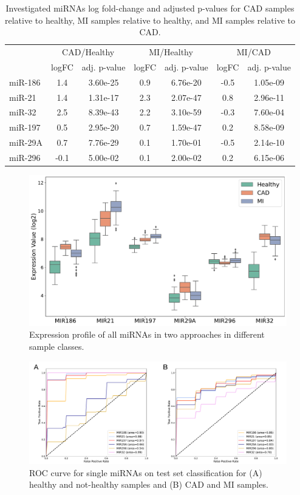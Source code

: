 \documentclass[sn-mathphys,Numbered]{sn-jnl}%
\theoremstyle{thmstyleone}%
\theoremstyle{thmstyletwo}%
\theoremstyle{thmstylethree}%
\begin{document}
\begin{table}
\centering
\caption{Investigated miRNAs log fold-change and adjusted p-values for CAD samples relative to healthy, MI samples relative to healthy, and MI samples relative to CAD.}
\label{tab:mirExptable}
\begin{tabular}{lcccccc}
\toprule
\multicolumn{1}{c}{} & \multicolumn{2}{c}{CAD/Healthy} & \multicolumn{2}{c}{MI/Healthy} & \multicolumn{2}{c}{MI/CAD} \\
\cmidrule(lr){2-3} \cmidrule(lr){4-5} \cmidrule(lr){6-7}
& logFC & adj. p-value & logFC & adj. p-value & logFC & adj. p-value\\
\midrule
miR-186 & 1.4 & 3.60e-25 & 0.9 & 6.76e-20 & -0.5 & 1.05e-09\\
miR-21 & 1.4 & 1.31e-17 & 2.3 & 2.07e-47 & 0.8 & 2.96e-11\\
miR-32 & 2.5 & 8.39e-43 & 2.2 & 3.10e-59 & -0.3 & 7.60e-04\\
miR-197 & 0.5 & 2.95e-20 & 0.7 & 1.59e-47 & 0.2 & 8.58e-09\\
miR-29A & 0.7 & 7.76e-29 & 0.1 & 1.70e-01 & -0.5 & 2.14e-10\\
miR-296 & -0.1 & 5.00e-02 & 0.1 & 2.00e-02 & 0.2 & 6.15e-06\\
\bottomrule
\end{tabular}
\end{table}

\begin{figure}
\centering 
\includegraphics[width=0.9\linewidth]{Expressionforall}
\caption{Expression profile of all miRNAs in two approaches in different sample classes.}\label{fig:Expall}
\end{figure}

\begin{figure}
\centering 
\includegraphics[width=0.95\linewidth]{miRs ROCs}
\caption{ROC curve for single miRNAs on test set classification for (A) healthy and not-healthy samples and (B) CAD and MI samples.}\label{fig:miRROC}
\end{figure}
\end{document}
